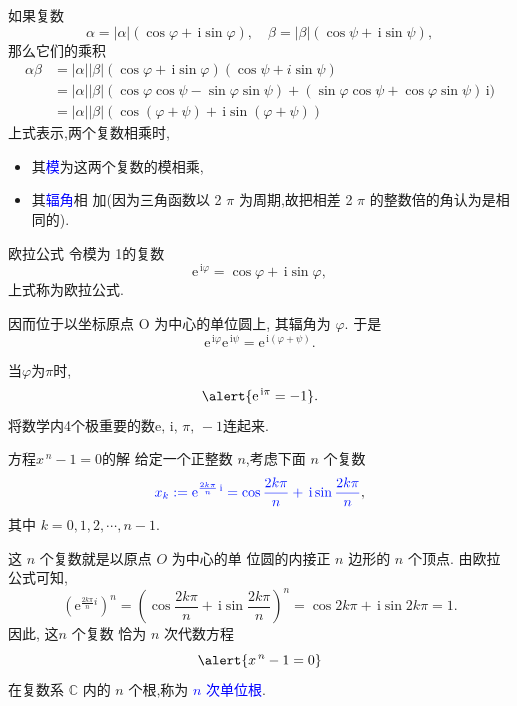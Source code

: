 \documentclass[10pt,punct]{ctexbeamer}
\def\e{\mathrm{e}}
\def\i{\, \mathrm{i}}
\newcommand{\blue}{\textcolor{blue}}
\begin{document}
\begin{frame}
	如果复数
\[
\alpha= |\alpha|(\cos \varphi+\i \operatorname{sin} \varphi), \quad
\beta=|\beta|(\cos \psi+\i \operatorname{sin} \psi),
\]
那么它们的乘积
	\[
	\begin{aligned}
		\alpha \beta &=|\alpha||\beta|(\cos \varphi+\i \operatorname{sin} \varphi)(\cos \psi+ i \operatorname{sin} \psi) \\
		&=|\alpha||\beta|(\cos \varphi \cos \psi-\sin \varphi \sin \psi)+(\sin \varphi \cos \psi+\cos \varphi \sin \psi) {\i}) \\
		&=|\alpha||\beta|(\cos (\varphi+\psi)+ \i \operatorname{sin}(\varphi+\psi))
	\end{aligned}
	\]
	上式表示,两个\alert{复数相乘}时,
    \begin{itemize}
    \item 其\blue{模}为这两个复数的模相乘,
    \item 其\blue{辐角}相 加(因为三角函数以 2 $\pi$ 为周期,故把相差 2 $\pi$ 的整数倍的角认为是相 同的).
    \end{itemize}
\end{frame}

\begin{frame}{欧拉公式}
	令模为 1的复数
	\[
	{{\e}^{{\i} \varphi}=\cos \varphi+{\i} \sin \varphi},
	\]
	上式称为\alert{欧拉公式}.

	因而位于以坐标原点 O 为中心的单位圆上,  其辐角为 $\varphi$. 于是
	\[
	{{\e}^{\i \varphi} {\e}^{{\i} \psi}={\e}^{{\i}(\varphi+\psi)}}.
	\]


	当$\varphi$为$\pi$时, $$\alert{\e^{\i\pi }=-1}.$$
	将数学内4个极重要的数$\e, \i, \, \pi,\,  -1 $连起来.
\end{frame}



\begin{frame}{方程$x^{\, n}-1=0$的解}
	给定一个正整数 $n$,考虑下面 $n$ 个复数
	\[
	\blue{x_k := {\e}^{\frac{2 k \pi }{n}{\i}}=\cos \frac{2 k \pi}{n}+\i\operatorname{sin} \frac{2 k \pi}{n}},
	\]
	其中 $k=0,1,2, \cdots, n-1.$

     这 $n$ 个复数就是以原点 $O$ 为中心的单 位圆的内接正 $n$ 边形的 $n$ 个顶点.
	由欧拉公式可知,
	\[
	\left({\e}^{\frac{2 {k\pi }}{n}i}\right)^{n}=\left(\cos \frac{2 k \pi}{n}+\i \operatorname{sin} \frac{2 k \pi}{n}\right)^{n}=\cos 2 k \pi+{\i} \sin 2 k \pi=1.
	\]
	因此, 这$n$ 个复数
    恰为 $n$ 次代数方程 $$\alert{x^{\,n}-1=0}$$ 在复数系 $\mathbb{C}$ 内的 $n$ 个根,称为 \blue{$n$ 次单位根}.

\end{frame}
\end{document}
